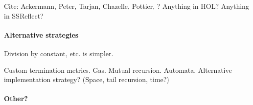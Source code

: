 Cite: Ackermann, Peter, Tarjan, Chazelle, Pottier, ?  Anything in HOL?  Anything in SSReflect?

\paragraph*{Alternative strategies}

Division by constant, etc. is simpler.

Custom termination metrics.  Gas.  Mutual recursion.  Automata.  Alternative implementation strategy?  (Space, tail recursion, time?)

\paragraph*{Other?}